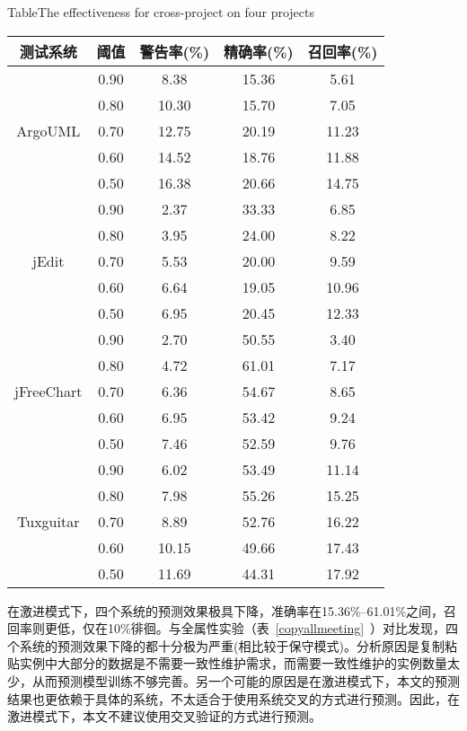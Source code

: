 \begin{table}[htbp]
{Table$\!$}{The effectiveness for cross-project on four projects}
\vspace{0.5em}
\centering
\wuhao
\begin{tabular}{ccccc}
\toprule[1.5pt]
{测试系统}&{阈值}&{警告率(\%)}&{精确率(\%)}&{召回率(\%)}\\
\midrule[1pt]
\multirow{5}{*}{ArgoUML}
&0.90&	8.38&	15.36&	5.61\\
&0.80&	10.30&	15.70&	7.05\\
&0.70&	12.75&	20.19&	11.23\\
&0.60&	14.52&	18.76&	11.88\\
&0.50&	16.38&	20.66&	14.75\\
\hline
\multirow{5}{*}{jEdit}
&0.90&	2.37&	33.33&	6.85\\
&0.80&	3.95&	24.00&	8.22\\
&0.70&	5.53&	20.00&	9.59\\
&0.60&	6.64&	19.05&	10.96\\
&0.50&	6.95&	20.45&	12.33\\
\hline
\multirow{5}{*}{jFreeChart}
&0.90&	2.70&	50.55&	3.40\\
&0.80&	4.72&	61.01&	7.17\\
&0.70&	6.36&	54.67&	8.65\\
&0.60&	6.95&	53.42&	9.24\\
&0.50&	7.46&	52.59&	9.76\\
\hline
\multirow{5}{*}{Tuxguitar}
&0.90&	6.02&	53.49&	11.14\\
&0.80&	7.98&	55.26&	15.25\\
&0.70&	8.89&	52.76&	16.22\\
&0.60&	10.15&	49.66&	17.43\\
&0.50&	11.69&	44.31&	17.92\\
\bottomrule[1.5pt]
\end{tabular}
\end{table}

在激进模式下，四个系统的预测效果极具下降，准确率在15.36\%--61.01\%之间，召回率则更低，仅在10\%徘徊。与全属性实验（表~\ref{copyallmeeting}~）对比发现，四个系统的预测效果下降的都十分极为严重(相比较于保守模式)。分析原因是复制粘贴实例中大部分的数据是不需要一致性维护需求，而需要一致性维护的实例数量太少，从而预测模型训练不够完善。另一个可能的原因是在激进模式下，本文的预测结果也更依赖于具体的系统，不太适合于使用系统交叉的方式进行预测。因此，在激进模式下，本文不建议使用交叉验证的方式进行预测。

